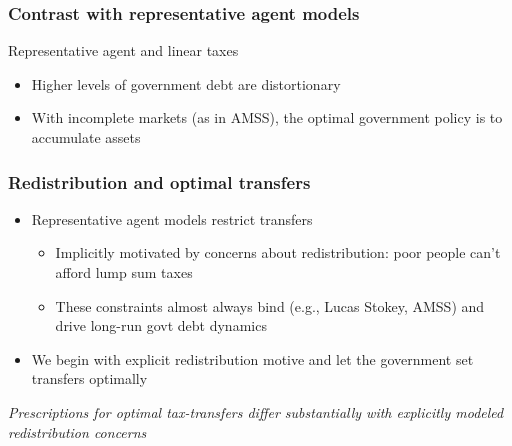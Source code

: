\documentclass{beamer}
\begin{document}
\begin{frame}
\frametitle{Contrast with representative agent models}
 Representative agent and linear taxes
\begin{itemize}
 \item Higher levels of government debt are distortionary
 \item With incomplete markets (as in  AMSS), the optimal  government policy is to accumulate assets
 \end{itemize}

 \end{frame}
%

 \begin{frame}
 \frametitle{Redistribution and optimal transfers}
 \begin{itemize}
  \item Representative agent models restrict transfers
  \begin{itemize}
 \item Implicitly motivated by concerns about  redistribution:  poor people can't afford lump sum taxes
  \item These constraints almost always bind (e.g.,  Lucas Stokey, AMSS) and drive long-run govt debt dynamics
  \end{itemize}
\item We begin with explicit redistribution motive  and let the government set transfers optimally
 \end{itemize}

 \vspace{4mm}
 \color{red}\emph{Prescriptions for optimal tax-transfers differ substantially with explicitly modeled redistribution concerns}
 \end{frame}
\end{document}
